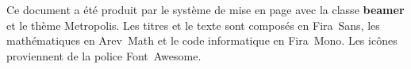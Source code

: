 
\begin{frame}[plain]
  \begin{adjustwidth}{20mm}{20mm}
    \scriptsize \raggedright %
    Ce document a été produit par le système de mise en page
    {\XeLaTeX} avec la classe \textbf{beamer} et le thème Metropolis.
    Les titres et le texte sont composés en Fira~Sans, les
    mathématiques en Arev~Math et le code informatique en Fira~Mono.
    Les icônes proviennent de la police Font~Awesome.
  \end{adjustwidth}
\end{frame}

